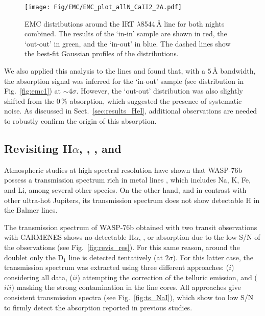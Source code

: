 \documentclass{aa}
\begin{document}
\begin{figure}[]
\centering
\texttt{[image: Fig/EMC/EMC\_plot\_allN\_CaII2\_2A.pdf]}
\caption{EMC distributions around the  IRT $\lambda$8544\,{\AA} line for both nights combined. The results of the `in-in' sample are shown in red, the `out-out' in green, and the `in-out' in blue. The dashed lines show the best-fit Gaussian profiles of the distributions.}
\label{fig:emc_Ca2}
\end{figure}


We also applied this analysis to the  lines and found that, with a $5$\,{\AA} bandwidth, the absorption signal was inferred for the `in-out' sample (see distribution in Fig.~\ref{fig:emc1}) at $\sim4\sigma$. However, the `out-out' distribution was also slightly shifted from the 0\,\% absorption, which suggested the presence of systematic noise. As discussed in Sect.~\ref{sec:results_HeI}, additional observations are needed to robustly confirm the origin of this absorption.




\subsection{Revisiting H$\alpha$, , , and }

Atmospheric studies at high spectral resolution have shown that WASP-76b possess a transmission spectrum rich in metal lines \citep{Seidel2019,Zak2019,Ehrenreich2020,Tabernero2020}, which includes Na, K, Fe, and Li, among several other species. On the other hand, and in contrast with other ultra-hot Jupiters, its transmission spectrum does not show detectable H in the Balmer lines. 

The transmission spectrum of WASP-76b obtained with two transit observations with CARMENES shows no detectable H$\alpha$, , or  absorption due to the low S/N of the observations (see Fig.~\ref{fig:revis_res}). For this same reason, around the  doublet only the  D$_1$ line is detected tentatively (at $2\sigma$). For this latter case, the transmission spectrum was extracted using three different approaches: 
($i$) considering all data, 
($ii$) attempting the correction of the telluric  emission, and ($iii$) masking the strong contamination in the line cores. All approaches give consistent transmission spectra (see Fig.~\ref{fig:ts_NaI}), which show too low S/N to firmly detect the  absorption reported in previous studies.
\end{document}
